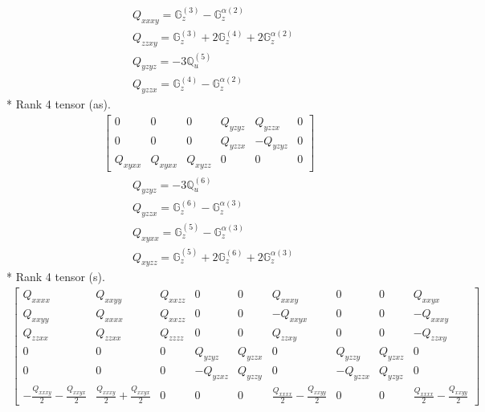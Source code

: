 \documentclass[fleqn,8pt,landscape]{jsarticle}
\begin{document}
\begin{align*}
& Q_{xxxy} = \mathbb{G}_{z}^{(3)} - \mathbb{G}_{z}^{\alpha(2)} \\
& Q_{zzxy} = \mathbb{G}_{z}^{(3)} + 2 \mathbb{G}_{z}^{(4)} + 2 \mathbb{G}_{z}^{\alpha(2)} \\
& Q_{yzyz} = - 3 \mathbb{Q}_{u}^{(5)} \\
& Q_{yzzx} = \mathbb{G}_{z}^{(4)} - \mathbb{G}_{z}^{\alpha(2)}
\end{align*}
* Rank 4 tensor (as).
\begin{align*}
\begin{bmatrix} 0 & 0 & 0 & Q_{yzyz} & Q_{yzzx} & 0 \\ 0 & 0 & 0 & Q_{yzzx} & - Q_{yzyz} & 0 \\ Q_{xyxx} & Q_{xyxx} & Q_{xyzz} & 0 & 0 & 0 \end{bmatrix}
\end{align*}
\begin{align*}
& Q_{yzyz} = - 3 \mathbb{Q}_{u}^{(6)} \\
& Q_{yzzx} = \mathbb{G}_{z}^{(6)} - \mathbb{G}_{z}^{\alpha(3)} \\
& Q_{xyxx} = \mathbb{G}_{z}^{(5)} - \mathbb{G}_{z}^{\alpha(3)} \\
& Q_{xyzz} = \mathbb{G}_{z}^{(5)} + 2 \mathbb{G}_{z}^{(6)} + 2 \mathbb{G}_{z}^{\alpha(3)}
\end{align*}
* Rank 4 tensor (s).
\begin{align*}
\begin{bmatrix} Q_{xxxx} & Q_{xxyy} & Q_{xxzz} & 0 & 0 & Q_{xxxy} & 0 & 0 & Q_{xxyx} \\ Q_{xxyy} & Q_{xxxx} & Q_{xxzz} & 0 & 0 & - Q_{xxyx} & 0 & 0 & - Q_{xxxy} \\ Q_{zzxx} & Q_{zzxx} & Q_{zzzz} & 0 & 0 & Q_{zzxy} & 0 & 0 & - Q_{zzxy} \\ 0 & 0 & 0 & Q_{yzyz} & Q_{yzzx} & 0 & Q_{yzzy} & Q_{yzxz} & 0 \\ 0 & 0 & 0 & - Q_{yzxz} & Q_{yzzy} & 0 & - Q_{yzzx} & Q_{yzyz} & 0 \\ - \frac{Q_{xxxy}}{2} - \frac{Q_{xxyx}}{2} & \frac{Q_{xxxy}}{2} + \frac{Q_{xxyx}}{2} & 0 & 0 & 0 & \frac{Q_{xxxx}}{2} - \frac{Q_{xxyy}}{2} & 0 & 0 & \frac{Q_{xxxx}}{2} - \frac{Q_{xxyy}}{2} \end{bmatrix}
\end{align*}
\end{document}
